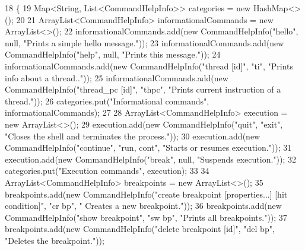 \begin{DoxyCode}
18                                                                                                            
                   \{
19     Map<String, List<CommandHelpInfo>> categories = \textcolor{keyword}{new} HashMap<>();
20 
21     ArrayList<CommandHelpInfo> informationalCommands = \textcolor{keyword}{new} ArrayList<>();
22     informationalCommands.add(\textcolor{keyword}{new} CommandHelpInfo(\textcolor{stringliteral}{"hello"}, null, \textcolor{stringliteral}{"Prints a simple hello message."}));
23     informationalCommands.add(\textcolor{keyword}{new} CommandHelpInfo(\textcolor{stringliteral}{"help"}, null, \textcolor{stringliteral}{"Prints this message."}));
24     informationalCommands.add(\textcolor{keyword}{new} CommandHelpInfo(\textcolor{stringliteral}{"thread [id]"}, \textcolor{stringliteral}{"ti"}, \textcolor{stringliteral}{"Prints info about a thread.."}));
25     informationalCommands.add(\textcolor{keyword}{new} CommandHelpInfo(\textcolor{stringliteral}{"thread\_pc [id]"}, \textcolor{stringliteral}{"thpc"}, \textcolor{stringliteral}{"Prints current instruction of
       a thread."}));
26     categories.put(\textcolor{stringliteral}{"Informational commands"}, informationalCommands);
27 
28     ArrayList<CommandHelpInfo> execution = \textcolor{keyword}{new} ArrayList<>();
29     execution.add(\textcolor{keyword}{new} CommandHelpInfo(\textcolor{stringliteral}{"quit"}, \textcolor{stringliteral}{"exit"}, \textcolor{stringliteral}{"Closes the shell and terminates the process."}));
30     execution.add(\textcolor{keyword}{new} CommandHelpInfo(\textcolor{stringliteral}{"continue"}, \textcolor{stringliteral}{"run, cont"}, \textcolor{stringliteral}{"Starts or resumes execution."}));
31     execution.add(\textcolor{keyword}{new} CommandHelpInfo(\textcolor{stringliteral}{"break"}, null, \textcolor{stringliteral}{"Suspends execution."}));
32     categories.put(\textcolor{stringliteral}{"Execution commands"}, execution);
33 
34     ArrayList<CommandHelpInfo> breakpoints = \textcolor{keyword}{new} ArrayList<>();
35     breakpoints.add(\textcolor{keyword}{new} CommandHelpInfo(\textcolor{stringliteral}{"create breakpoint [properties...] [hit condition]"}, \textcolor{stringliteral}{"cr bp"}, \textcolor{stringliteral}{"
      Creates a new breakpoint."}));
36     breakpoints.add(\textcolor{keyword}{new} CommandHelpInfo(\textcolor{stringliteral}{"show breakpoint"}, \textcolor{stringliteral}{"sw bp"}, \textcolor{stringliteral}{"Prints all breakpoints."}));
37     breakpoints.add(\textcolor{keyword}{new} CommandHelpInfo(\textcolor{stringliteral}{"delete breakpoint [id]"}, \textcolor{stringliteral}{"del bp"}, \textcolor{stringliteral}{"Deletes the breakpoint."}));

\end{DoxyCode}
